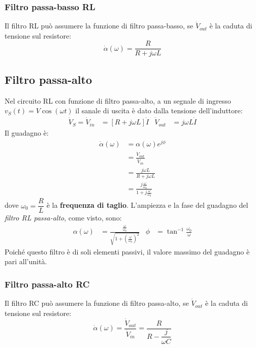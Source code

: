 \documentclass{article}
\begin{document}
\subsubsection{Filtro passa-basso RL}
Il filtro RL può assumere la funzione di filtro
passa-basso, se $\dot V_{out}$ è la caduta di tensione sul resistore:
\[\dot \alpha(\omega)=\frac{R}{R+j \omega L}\]



\subsection{Filtro passa-alto}
Nel circuito RL con funzione di filtro passa-alto, a un segnale di ingresso $v_S(t)=V \cos(\omega t)$ il sanale di uscita è dato dalla tensione dell'induttore:
\begin{align*}
    \dot V_S = \dot V_{in} &= \left[R + j \omega L\right]\dot I & \dot V_{out} &= j \omega L \dot I
\end{align*}
Il guadagno è:
\begin{align*}
    \dot \alpha(\omega) &= \alpha(\omega) e^{j \phi}
    \\
    &=\frac{\dot V_{out}}{\dot V_{in}}
    \\
    &= \frac{j \omega L}{R+j \omega L}
    \\
    &= \frac{j \frac{\omega}{\omega_0}}{1+j \frac{\omega}{\omega_0}}
\end{align*}
dove $\omega_0 = \dfrac{R}{L}$ è la \textbf{frequenza di taglio}. L'ampiezza e la fase del guadagno del \textit{filtro RL passa-alto}, come visto, sono:
\begin{align*}
    \alpha(\omega) &= \frac{\frac{\omega}{\omega_0}}{\sqrt{1+\left(\frac{\omega}{\omega_0}\right)^2}} & \phi &= \tan^{-1} \frac{\omega_0}{\omega}
\end{align*}
Poiché questo filtro è di soli elementi passivi, il
valore massimo del guadagno è pari all'unità.


\subsubsection{Filtro passa-alto RC}
Il filtro RC può assumere la funzione di filtro
passa-alto, se $\dot V_{out}$ è la caduta di tensione sul resistore:
\[\dot \alpha(\omega) = \frac{\dot V_{out}}{\dot V_{in}} = \frac{R}{R - \dfrac{j}{\omega C}}\]
\end{document}
